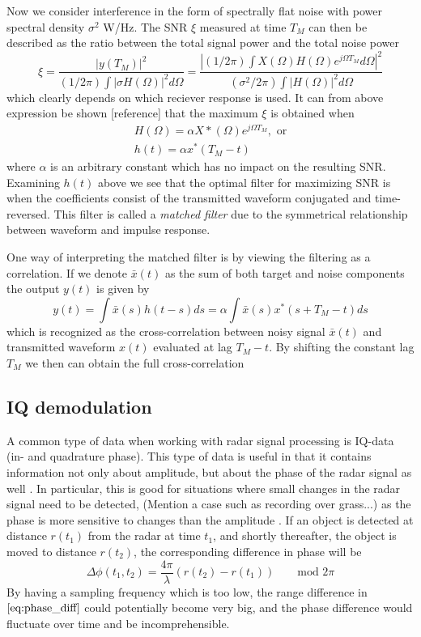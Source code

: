 \documentclass[a4paper, 12pt]{article}
\begin{document}
Now we consider interference in the form of spectrally flat noise with power spectral density $\sigma^2$ W/Hz. The SNR $\xi$ measured at time $T_M$ can then be described as the ratio between the total signal power and the total noise power
%
\begin{equation}
	\xi
	= \frac{|y(T_M)|^{2}}{(1/2\pi)\int|\sigma H(\Omega)|^{2}d\Omega}
	= \frac{|(1/2\pi)\int X(\Omega)H(\Omega)e^{j\Omega T_M}d\Omega|^2}{(\sigma^2/2\pi)\int|H(\Omega)|^{2}d\Omega}
\end{equation}
%
which clearly depends on which reciever response is used. It can from above expression be shown [reference] that the maximum $\xi$ is obtained when 
%
\begin{gather}
 H(\Omega) = \alpha X*(\Omega)e^{j\Omega T_M}, \text{ or} \\
\label{eq:123}
h(t) = \alpha x^*(T_M - t)
\end{gather}
%
where $\alpha$ is an arbitrary constant which has no impact on the resulting SNR. Examining $h(t)$ above we see that the optimal filter for maximizing SNR is when the coefficients consist of the transmitted waveform conjugated and time-reversed. This filter is called a \emph{matched filter} due to the symmetrical relationship between waveform and impulse response.

One way of interpreting the matched filter is by viewing the filtering as a correlation. If we denote $\bar{x}(t)$ as the sum of both target and noise components the output $y(t)$ is given by
%
\begin{equation}
	y(t) = \int \bar{x}(s)h(t-s)ds = \alpha\int \bar{x}(s)x^*(s + T_M - t)ds
\end{equation}
%
which is recognized as the cross-correlation between noisy signal $\bar	{x}(t)$ and transmitted waveform $x(t)$ evaluated at lag $T_M-t$. By shifting the constant lag $T_M$ we then can obtain the full cross-correlation 

\subsection{IQ demodulation}
A common type of data when working with radar signal processing is IQ-data (in- and quadrature phase).  This type of data is useful in that it contains information not only about amplitude, but about the phase of the radar signal as well \citep{richards_2014}. In particular, this is good for situations where small changes in the radar signal need to be detected, (Mention a case such as recording over grass...) as the phase is more sensitive to changes than the amplitude \citep{lien_gillian_karagozler_amihood_schwesig_olson_raja_poupyrev_2016}. If an object is detected at distance $r(t_1)$ from the radar at time $t_1$, and shortly thereafter, the object is moved to distance $r(t_2)$, the corresponding difference in phase will be
\begin{equation}
	\label{eq:phase_diff}
	\Delta\phi(t_1, t_2)=\frac{4\pi}{\lambda}(r(t_2)-r(t_1)) \quad\quad \textrm{mod 2$\pi$}
\end{equation}
By having a sampling frequency which is too low, the range difference in $\eqref{eq:phase_diff}$ could potentially become very big, and the phase difference would fluctuate over time and be incomprehensible.
\end{document}
